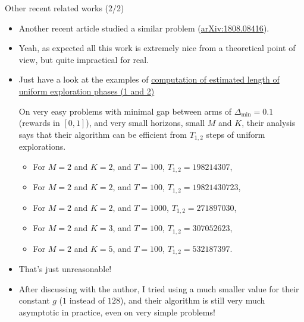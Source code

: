 \documentclass[12pt,english,ignorenonframetext,]{beamer}
\providecommand{\tightlist}{%
  \setlength{\itemsep}{0pt}\setlength{\parskip}{0pt}}
\begin{document}
\begin{frame}{Other recent related works (2/2)}

\begin{itemize}\tightlist
\item
Another recent article studied a similar problem (\textcolor{blue}{\href{https://arxiv.org/abs/1808.08416}{arXiv:1808.08416}}).

\pause

\item
Yeah, as expected all this work is extremely nice from a theoretical point of view, but quite impractical for real.

\item
Just have a look at the examples of \href{https://smpybandits.readthedocs.io/en/latest/docs/Policies.MusicalChairNoSensing.html?highlight=musicalchairnosensing\#Policies.MusicalChairNoSensing.estimate\_length\_phases\_12}{computation of estimated length of uniform exploration phases (1 and 2)}

On very easy problems with minimal gap between arms of $\Delta_{\min} = 0.1$ (rewards in $[0,1]$), and very small horizons, small $M$ and $K$, their analysis says that their algorithm can be efficient from $T_{1,2}$ steps of uniform explorations.

\begin{itemize}
\item For $M=2$ and $K=2$, and $T=100$, $T_{1,2} = 198214307$,
\item For $M=2$ and $K=2$, and $T=100$, $T_{1,2} = 19821430723$,
\item For $M=2$ and $K=2$, and $T=1000$, $T_{1,2} = 271897030$,
\item For $M=2$ and $K=3$, and $T=100$, $T_{1,2} = 307052623$,
\item For $M=2$ and $K=5$, and $T=100$, $T_{1,2} = 532187397$.
\end{itemize}

\item
\danger{} That's just unreasonable!

\item
After discussing with the author, I tried using a much smaller value for their constant $g$ ($1$ instead of $128$), and their algorithm is still very much asymptotic in practice, even on very simple problems!


\end{itemize}
\end{frame}
\end{document}
